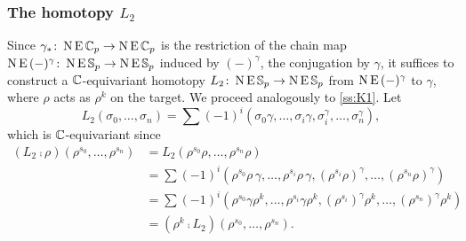 \subsubsection{The homotopy $L_2$}

Since $\gamma_\ast \colon \operatorname{N}\operatorname{E}\mathbb{C}_p \to \operatorname{N}\operatorname{E}\mathbb{C}_p$ is the restriction of the chain map $\operatorname{N}\operatorname{E}\,(-)^\gamma \colon \operatorname{N}\operatorname{E}\mathbb{S}_p \to \operatorname{N}\operatorname{E}\mathbb{S}_p$ induced by $(-)^\gamma$, the conjugation by $\gamma$, it suffices to construct a $\mathbb{C}$-equivariant homotopy $L_2 \colon \operatorname{N}\operatorname{E}\mathbb{S}_p \to \operatorname{N}\operatorname{E}\mathbb{S}_p$ from $\operatorname{N}\operatorname{E}\,(-)^\gamma$ to $\gamma$, where $\rho$ acts as $\rho^k$ on the target.
We proceed analogously to \cref{ss:K1}.
Let
\[
L_2(\sigma_0,\dots,\sigma_n) = \sum (-1)^i (\sigma_0\gamma,\dots,\sigma_i\gamma,\sigma_i^\gamma,\dots,\sigma_n^\gamma),
\]
which is $\mathbb{C}$-equivariant since
\begin{align*}
	(L_2 \comp \rho)(\rho^{s_0},\dots,\rho^{s_n}) &=
	L_2(\rho^{s_0}\rho, \dots, \rho^{s_n}\rho) \\ &=
	\sum (-1)^i (\rho^{s_0} \rho\,\gamma,\dots,\rho^{s_i} \rho\,\gamma,(\rho^{s_i} \rho)^\gamma,\dots,(\rho^{s_n} \rho)^\gamma) \\ &=
	\sum (-1)^i (\rho^{s_0} \gamma \rho^k,\dots,\rho^{s_i} \gamma \rho^k,(\rho^{s_i})^\gamma \rho^k ,\dots,(\rho^{s_n})^\gamma \rho^k) \\ &=
	(\rho^k \comp L_2)(\rho^{s_0},\dots,\rho^{s_n}).
\end{align*}
